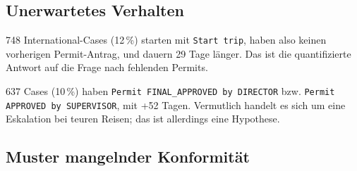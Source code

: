 
\subsection{Unerwartetes Verhalten}
\label{sec:unerwartet}

748 International-Cases (12\,\%) starten mit \texttt{Start trip}, haben
also keinen vorherigen Permit-Antrag, und dauern 29 Tage länger. Das ist
die quantifizierte Antwort auf die Frage nach fehlenden Permits.

637 Cases (10\,\%) haben \texttt{Permit FINAL\_APPROVED by DIRECTOR}
bzw. \texttt{Permit APPROVED by SUPERVISOR}, mit +52 Tagen. Vermutlich
handelt es sich um eine Eskalation bei teuren Reisen; das ist allerdings
eine Hypothese.


\subsection{Muster mangelnder Konformität}
\label{sec:nonconformance}

%
%

